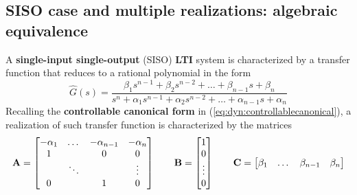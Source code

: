 \subsection{SISO case and multiple realizations: algebraic equivalence} \label{sec:dyn:realizations}
	A \textbf{single-input single-output} (SISO) \textbf{LTI} system is characterized by a transfer function that reduces to a rational polynomial in the form
	\[ \tag{SISO-LTI}
	\hat G(s) = \frac{\beta_1 s^{n-1} + \beta_2 s^{n-2} + \dots + \beta_{n-1}s + \beta_n }{s^n + \alpha_1 s^{n-1} + \alpha_2 s^{n-2} + \dots + \alpha_{n-1} s + \alpha_n} \]
	Recalling the \textbf{controllable canonical form} in (\ref{eq:dyn:controllablecanonical}), a realization of such transfer function is characterized by the matrices
	\[ \mathbf{A} = \begin{bmatrix}  -\alpha_1 & \dots & - \alpha_{n-1} & - \alpha_n \\
	1 &  & 0 & 0 \\ 
	 & \ddots & & \vdots \\
 	0 & & 1 & 0  \end{bmatrix} \qquad \mathbf{B} = \begin{bmatrix} 1 \\ 0 \\ \vdots \\ 0 \end{bmatrix} \qquad \mathbf{C} = \begin{bmatrix} \beta_1 & \dots & \beta_{n-1} & \beta_n \end{bmatrix} \]
	
